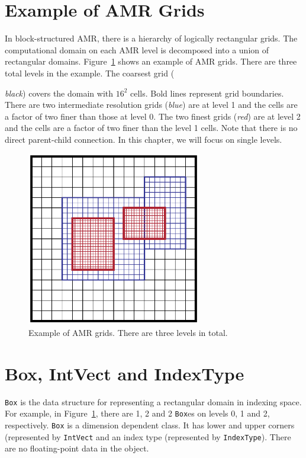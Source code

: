 \section{Example of AMR Grids}
\label{sec:basics:amrgrids}

In block-structured AMR, there is a hierarchy of logically rectangular
grids.  The computational domain on each AMR level is decomposed into
a union of rectangular domains.  Figure~\ref{fig:basics:amrgrids} shows
an example of AMR grids.  There are three total levels in the example.
The coarsest grid ({\emph{black}) covers the domain with $16^2$
cells. Bold lines represent grid boundaries.  There are two
intermediate resolution grids ({\emph{blue}}) are at level 1 and the
cells are a factor of two finer than those at level 0.  The two
finest grids ({\emph{red}}) are at level 2 and the cells are a
factor of two finer than the level 1 cells.  Note that there is no
direct parent-child connection.  In this chapter, we will focus on
single levels.

\begin{figure}
  \centering
  \includegraphics[width=3in]{./Basics/amrgrids.pdf}
  \caption{\label{fig:basics:amrgrids} Example of AMR grids.  There are
    three levels in total.}
\end{figure}

\section{Box, IntVect and IndexType}
\label{sec:basics:box}

{\tt Box} is the data structure for representing a rectangular domain
in indexing space.  For example, in Figure~\ref{fig:basics:amrgrids},
there are 1, 2 and 2 {\tt Box}es on levels 0, 1 and 2, respectively.
{\tt Box} is a dimension dependent class.  It has lower and upper
corners (represented by {\tt IntVect} and an index type (represented
by {\tt IndexType}).  There are no floating-point data in the object.

}
